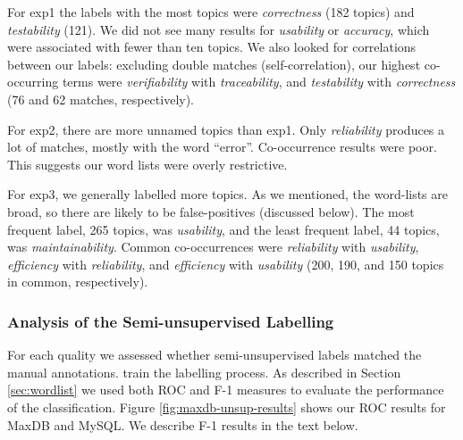 \documentclass[smallextended]{svjour3}       %
\begin{document}
For \textsf{exp1} the labels with the most topics
were
\emph{correctness} (182 topics) and \emph{testability} (121). 
We did not see many results for \emph{usability} or \emph{accuracy}, which were associated with fewer than ten topics. 
We also looked for correlations between our labels: excluding double matches (self-correlation), our highest co-occurring terms were \emph{verifiability}
with \emph{traceability}, and \emph{testability} with \emph{correctness} (76 and 62 matches, respectively).

For \textsf{exp2}, there are more unnamed topics than \textsf{exp1}. 
Only \emph{reliability} produces a lot of matches, mostly with the word ``error''. 
Co-occurrence results were poor. This suggests our word lists were overly restrictive.

For \textsf{exp3}, we generally labelled more topics. 
As we mentioned, the word-lists are broad, so there are likely to be false-positives (discussed below). 
The most frequent label, 265 topics, was \emph{usability}, and the
least frequent label, 44 topics, was \emph{maintainability}. 
Common co-occurrences were \emph{reliability} with \emph{usability}, \emph{efficiency} with \emph{reliability}, and \emph{efficiency} with \emph{usability}
(200, 190, and 150 topics in common, respectively). 



\subsubsection{Analysis of the Semi-unsupervised Labelling} %
For each quality we assessed whether semi-unsupervised labels matched the manual annotations. %
train the labelling process.
As described in Section \ref{sec:wordlist} we used both ROC and F-1 measures to evaluate the performance of the classification.
Figure \ref{fig:maxdb-unsup-results} shows our ROC results for MaxDB and MySQL. We describe F-1 results in the text below.
\end{document}
